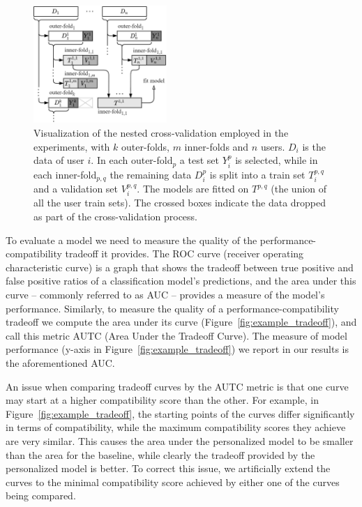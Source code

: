 \documentclass[letterpaper]{article} %
\theoremstyle{definition}
\begin{document}
 
\begin{figure}[t]
     \centering
     \includegraphics[width=0.45\textwidth]{cross_validation}
     \caption{Visualization of the nested cross-validation employed in the experiments, with $k$ outer-folds, $m$ inner-folds and $n$ users. $D_i$ is the data of user $i$. In each outer-fold$_p$ a test set $Y_i^p$ is selected, while in each inner-fold$_{p,q}$ the remaining data $D_i^p$ is split into a train set $T_i^{p,q}$ and a validation set $V_i^{p,q}$. The models are fitted on $T^{p,q}$ (the union of all the user train sets). The crossed boxes indicate the data dropped as part of the cross-validation process.}
    \label{fig:cross_validation}
\end{figure}
% 

To evaluate a model we need to measure the quality of the performance-compatibility tradeoff it provides.
The  ROC curve (receiver operating characteristic curve) is a graph that shows the tradeoff between true positive and false positive ratios of a classification model's predictions, and the area under this curve -- commonly referred to as AUC -- provides a measure of the model's performance. 
 Similarly, to measure the quality of a performance-compatibility tradeoff we compute the  area under its curve (Figure~\ref{fig:example_tradeoff}), and call this metric AUTC (Area Under the Tradeoff Curve). The measure of model performance (y-axis in Figure~\ref{fig:example_tradeoff}) we report in our results is the aforementioned AUC. 

An issue when comparing tradeoff curves by the AUTC metric is that one curve may start at a higher compatibility score than the other.
For example, in Figure~\ref{fig:example_tradeoff}, the starting points of the curves differ significantly in terms of compatibility, while the maximum compatibility scores they achieve are very similar.
This causes the area under the personalized model to be smaller than the area for the baseline, while clearly the tradeoff provided by the personalized model is better.
To correct this issue, we artificially extend the curves to the minimal compatibility score achieved by either one of the curves being compared.
\end{document}
